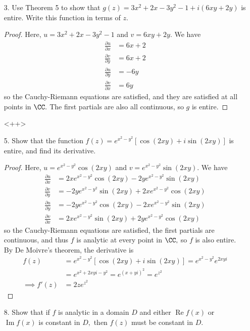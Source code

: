 \documentclass{article}
\DeclareMathOperator{\re}{Re}
\DeclareMathOperator{\im}{Im}
\begin{document}
\begin{itemize}
	\item[3.] Use Theorem 5 to show that $g(z)=3x^2+2x-3y^2-1+i(6xy+2y)$ is entire. Write this function in terms of $z.$
		\begin{proof}
			Here, $u=3x^2+2x-3y^2-1$ and $v=6xy+2y.$ We have
			\begin{align*}
				\frac{\partial u}{\partial x} &= 6x + 2 \\
				\frac{\partial v}{\partial y} &= 6x + 2 \\
				\frac{\partial u}{\partial y} &= -6y \\
				\frac{\partial v}{\partial x} &= 6y
			\end{align*}
			so the Cauchy-Riemann equations are satisfied, and they are satisfied at all points in $\CC.$ The first partials are also all continuous, so $g$ is entire.
		\end{proof}<++>

	\item[5.] Show that the function $f(z)=e^{x^2-y^2}\left[ \cos(2xy)+i\sin(2xy) \right]$ is entire, and find its derivative.
		\begin{proof}
			Here, $u=e^{x^2-y^2}\cos(2xy)$ and $v=e^{x^2-y^2}\sin(2xy).$ We have
			\begin{align*}
				\frac{\partial u}{\partial x} &= 2xe^{x^2-y^2}\cos(2xy) -2ye^{x^2-y^2}\sin(2xy) \\
				\frac{\partial v}{\partial y} &= -2ye^{x^2-y^2}\sin(2xy) + 2xe^{x^2-y^2}\cos(2xy) \\
				\frac{\partial u}{\partial y} &= -2ye^{x^2-y^2}\cos(2xy) - 2xe^{x^2-y^2}\sin(2xy) \\
				\frac{\partial v}{\partial x} &= 2xe^{x^2-y^2}\sin(2xy) + 2ye^{x^2-y^2}\cos(2xy) 
			\end{align*}
			so the Cauchy-Riemann equations are satisfied, the first partials are continuous, and thus $f$ is analytic at every point in $\CC,$ so $f$ is also entire. By De Moivre's theorem, the derivative is
			\begin{align*}
				f(z) &= e^{x^2-y^2}\left[ \cos(2xy)+i\sin(2xy) \right] = e^{x^2-y^2}e^{2xyi} \\
				&= e^{x^2+2xyi - y^2} = e^{(x+yi)^2} = e^{z^2} \\
				\implies f'(z) &= 2ze^{z^2}
			\end{align*}
		\end{proof}

	\item[8.] Show that if $f$ is analytic in a domain $D$ and either $\re f(x)$ or $\im f(x)$ is constant in $D,$ then $f(z)$ must be constant in $D.$


\end{itemize}
\end{document}
